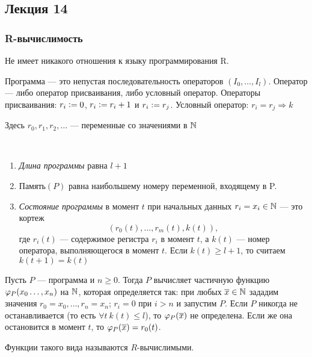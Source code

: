 \subsection{Лекция 14}

\subsubsection{R-вычислимость}
\begin{remark}
    Не имеет никакого отношения к языку программирования R.
\end{remark}

\begin{definition}
    Программа — это непустая последовательность операторов $(I_0, \dots, I_l)$.
    Оператор — либо оператор присваивания, либо условный оператор.
    Операторы присваивания: $r_i\vcentcolon= 0$, $r_i\vcentcolon= r_i+1$ и $r_i\vcentcolon= r_j$.
    Условный оператор: $r_i=r_j\Rightarrow k$
    
    Здесь $r_0, r_1, r_2, \dots$ — переменные со значениями в ${\mathbb N}$
\end{definition}


\begin{definition}\
    \begin{enumerate}
        \item \emph{Длина программы} равна $l+1$
        \item $\text{Память}(P)$ равна наибольшему номеру переменной, входящему в P.
        \item \emph{Состояние программы} в момент $t$ при начальных данных $r_i=x_i\in {\mathbb N}$ — это кортеж
            $$(r_0(t), \dots, r_m(t), k(t)),$$
            где $r_i(t)$ — содержимое регистра $r_i$ в момент $t$, а $k(t)$ — номер оператора, выполняющегося в момент $t$. Если $k(t)\ge l+1$, то считаем $k(t+1)=k(t)$
    \end{enumerate}
\end{definition}

\begin{definition}
    Пусть $P$ — программа и $n\ge 0$. Тогда $P$ вычисляет частичную функцию $\varphi_P(x_0 \ldots, x_n)$ на ${\mathbb N}$, которая определяется так: при любых $\overline{x}\in{\mathbb N}$ зададим значения $r_0=x_0,\dots,r_n=x_n$; $r_i=0$ при $i>n$ и запустим $P$. Если $P$ никогда не останавливается (то есть $\forall t~k(t)\le l$), то $\varphi_P(\overline{x})$ не определена. Если же она остановится в момент $t$, то $\varphi_P(\overline{x})=r_0(t)$.

    Функции такого вида называются $R$-вычислимыми.
\end{definition}

